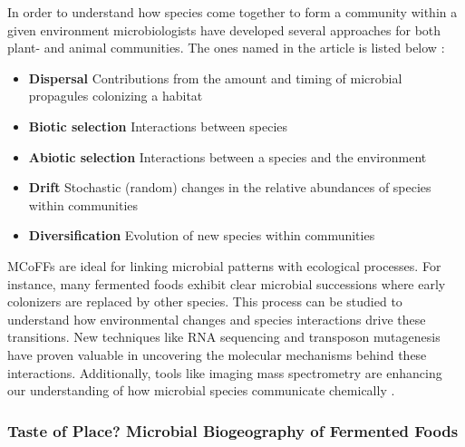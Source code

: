 In order to understand how species come together to form a community within a given environment microbiologists have developed several approaches for both plant- and animal communities. The ones named in the article is listed below \cite*{L1-FermentedFoods}: 

\begin{highlight}
    \begin{itemize}
        \item \textbf{Dispersal}
        \subitem Contributions from the amount and timing of microbial propagules colonizing a habitat
        \vspace*{0.3em}

        \item \textbf{Biotic selection}
        \subitem Interactions between species
        \vspace*{0.3em}

        \item \textbf{Abiotic selection}
        \subitem Interactions between a species and the environment
        \vspace*{0.3em}

        \item \textbf{Drift}
        \subitem Stochastic (random) changes in the relative abundances of species within communities
        \vspace*{0.3em}

        \item \textbf{Diversification}
        \subitem Evolution of new species within communities
    \end{itemize}
\end{highlight}

MCoFFs are ideal for linking microbial patterns with ecological processes. For instance, many fermented foods exhibit clear microbial successions where early colonizers are replaced by other species. This process can be studied to understand how environmental changes and species interactions drive these transitions. New techniques like RNA sequencing and transposon mutagenesis have proven valuable in uncovering the molecular mechanisms behind these interactions. Additionally, tools like imaging mass spectrometry are enhancing our understanding of how microbial species communicate chemically \cite*{L1-FermentedFoods}.

\subsubsection*{Taste of Place? Microbial Biogeography of Fermented Foods}

